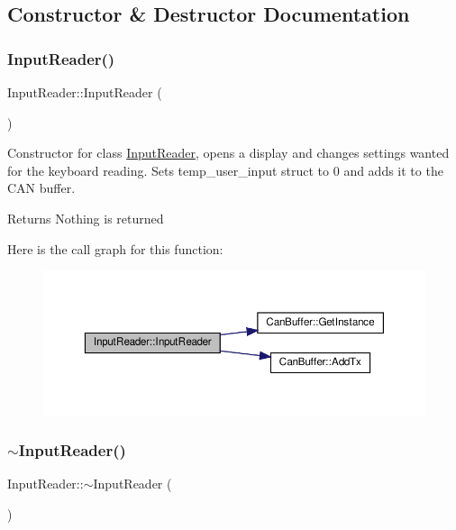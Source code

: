 \subsection{Constructor \& Destructor Documentation}
\mbox{\label{classInputReader_ae7d7eaec9edd0b8a5e6c5870f23070c3}} 
\subsubsection{\texorpdfstring{Input\+Reader()}{InputReader()}}
{\footnotesize\ttfamily Input\+Reader\+::\+Input\+Reader (\begin{DoxyParamCaption}{ }\end{DoxyParamCaption})}

Constructor for class \hyperlink{classInputReader}{Input\+Reader}, opens a display and changes settings wanted for the keyboard reading. Sets temp\+\_\+user\+\_\+input struct to 0 and adds it to the C\+AN buffer. \begin{DoxyReturn}{Returns}
Nothing is returned 
\end{DoxyReturn}
Here is the call graph for this function\+:
\nopagebreak
\begin{figure}[H]
\begin{center}
\leavevmode
\includegraphics[width=350pt]{classInputReader_ae7d7eaec9edd0b8a5e6c5870f23070c3_cgraph}
\end{center}
\end{figure}
\mbox{\label{classInputReader_a38875ce3bae818dd0836da36fb7ea891}} 
\subsubsection{\texorpdfstring{$\sim$\+Input\+Reader()}{~InputReader()}}
{\footnotesize\ttfamily Input\+Reader\+::$\sim$\+Input\+Reader (\begin{DoxyParamCaption}{ }\end{DoxyParamCaption})}


